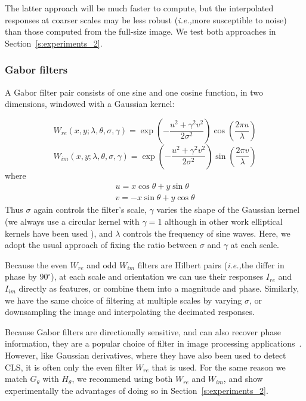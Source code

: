 \documentclass{IEEEtran}
\def\ie{\emph{i.e.,}}
\newcommand{\sref}[1]{Section~\ref{#1}}
\def\deg{\ensuremath{^\circ}}
\begin{document}
The latter approach will be much faster to compute, but the interpolated responses at coarser scales may be less robust (\ie more susceptible to noise) than those computed from the full-size image. We test both approaches in \sref{s:experiments_2}.


\subsubsection{Gabor filters}
\label{s:filtering_gabor}
A Gabor filter pair consists of one sine and one cosine function, in two dimensions, windowed with a Gaussian kernel:

\begin{equation}
W_{re}(x,y;\lambda,\theta,\sigma,\gamma) = \exp \left( -\frac{u^2 + \gamma^2 v^2}{2\sigma^2} \right)
    \cos \left( \frac{2\pi u}{\lambda} \right)
\label{e:gabor_real}
\end{equation}
\begin{equation}
W_{im}(x,y;\lambda,\theta,\sigma,\gamma) = \exp \left( -\frac{u^2 + \gamma^2 v^2}{2\sigma^2} \right)
    \sin \left(  \frac{2\pi v}{\lambda} \right)
\label{e:gabor_imag}
\end{equation}
where
\begin{align}
u = x\cos\theta + y\sin\theta \\
%
v = -x\sin\theta + y\cos\theta
\label{e:gabor_xy}
\end{align}
%
Thus $\sigma$ again controls the filter's scale, $\gamma$ varies the shape of the Gaussian kernel (we always use a circular kernel with $\gamma=1$ although in other work elliptical kernels have been used \cite{Dabbah_etal_MICCAI10}), and $\lambda$ controls the frequency of sine waves. Here, we adopt the usual approach of fixing the ratio between $\sigma$ and $\gamma$ at each scale.

Because the even $W_{re}$ and odd $W_{im}$ filters are Hilbert pairs (\ie the differ in phase by $90\deg$), at each scale and orientation we can use their responses $I_{re}$ and $I_{im}$ directly as features, or combine them into a magnitude and phase. Similarly, we have the same choice of filtering at multiple scales by varying $\sigma$, or downsampling the image and interpolating the decimated responses.

Because Gabor filters are directionally sensitive, and can also recover phase information, they are a popular choice of filter in image processing applications~\cite{Daugman_TASSP88}. However, like Gaussian derivatives, where they have also been used to detect CLS, it is often only the even filter $W_{re}$ that is used. For the same reason we match $G_\theta$ with $H_\theta$, we recommend using both $W_{re}$ and $W_{im}$, and show experimentally the advantages of doing so in \sref{s:experiments_2}.
\end{document}
